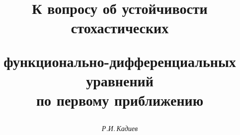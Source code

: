 








\newcommand{\col}{\operatorname{col}}


\newcommand{\Def}{\overset{\mathrm{def}}{=}{}}


\newcommand{\tts}[1]{}







\setcounter{page}{3}















\author{\it Р.И.\,Кадиев}




\title{К вопросу об устойчивости стохастических


функционально-дифференциальных уравнений\\


по первому приближению}





\date{}




\pagestyle{plain} %







\maketitle


